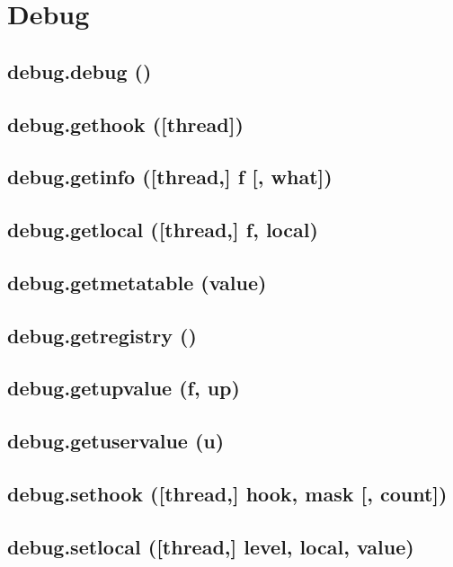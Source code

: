 \documentclass[12pt]{article}
\begin{document}
\newpage

\section{Debug}

\subsection{debug.debug ()}

\subsection{debug.gethook ([thread])}

\subsection{debug.getinfo ([thread,] f [, what])}

\subsection{debug.getlocal ([thread,] f, local)}

\subsection{debug.getmetatable (value)}

\subsection{debug.getregistry ()}

\subsection{debug.getupvalue (f, up)}

\subsection{debug.getuservalue (u)}

\subsection{debug.sethook ([thread,] hook, mask [, count])}

\subsection{debug.setlocal ([thread,] level, local, value)}
\end{document}
